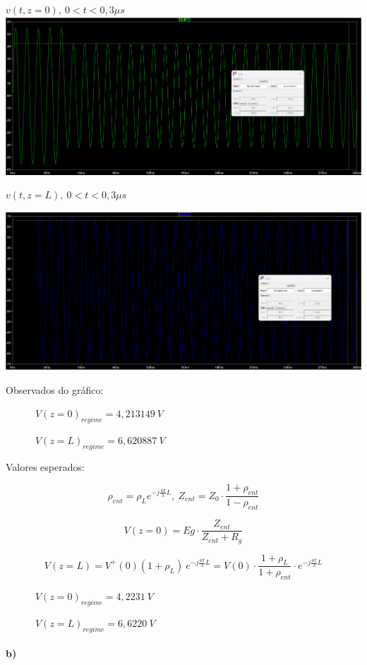 \documentclass[12pt,a4paper]{article}
\begin{document}
\begin{center}
    $v(t,z=0),\ 0 < t < 0,3 \mu s$
    \includegraphics[scale=0.32]{2 a i.png} \\ \break
    
    $v(t,z=L),\ 0 < t < 0,3 \mu s$
    
    \includegraphics[scale=0.3]{2 a ii.png}
\end{center}

Observados do gráfico:

\ \ \ \ \ \ $V(z=0)_{regime}=4,213149\ V$

\ \ \ \ \ \ $V(z=L)_{regime}=6,620887\ V$


Valores esperados:

$$\rho_{ent}=\rho_L e^{-j\frac{4\pi}{\lambda}L},\ Z_{ent}=Z_0\cdot\frac{1+\rho_{ent}}{1-\rho_{ent}}$$

$$V(z=0)=Eg\cdot \frac{Z_{ent}}{Z_{ent}+R_g}$$

$$V(z=L)=V^+(0) (1+\rho_L)\ e^{-j\frac{4\pi}{\lambda}L}=V(0)\cdot \frac{1+\rho_L}{1+\rho_{ent}}\cdot e^{-j\frac{4\pi}{\lambda}L}$$

\ \ \ \ \ \ $V(z=0)_{regime} = 4,2231\ V$

\ \ \ \ \ \ $V(z=L)_{regime} = 6,6220\ V$

\paragraph{b)}
\end{document}
